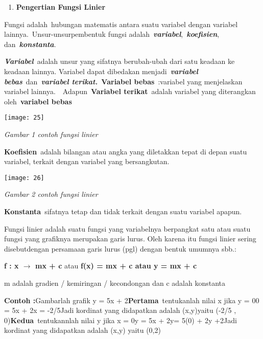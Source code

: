 \documentclass[11pt,fleqn]{book} %
\begin{document}
\begin{enumerate}
\item \textbf{ Pengertian Fungsi Linier}
\end{enumerate}

\noindent \textbf{}

Fungsi adalah~hubungan matematis antara suatu variabel dengan variabel lainnya.~Unsur-unsurpembentuk fungsi adalah~\textbf{\textit{variabel}},~\textbf{\textit{koefisien}}, dan~\textbf{\textit{konstanta}}.

\textbf{\textit{Variabel}}~adalah unsur yang sifatnya berubah-ubah dari satu keadaan ke keadaan lainnya. Variabel dapat dibedakan menjadi~\textbf{\textit{variabel bebas}}~dan~\textbf{\textit{variabel terikat.}}~\textbf{Variabel bebas}~:variabel yang menjelaskan variabel lainnya.~~Adapun~\textbf{Variabel terikat}~adalah variabel yang diterangkan oleh~\textbf{variabel bebas}

\begin{center}
\texttt{[image: 25]}
\end{center}

\textit{Gambar 1 contoh fungsi linier}

\textbf{Koefisien}~adalah bilangan atau angka yang diletakkan tepat di depan suatu variabel, terkait dengan variabel yang bersangkutan.

\begin{center}
\texttt{[image: 26]}
\end{center}

\textit{Gambar 2 contoh fungsi linier}



\textbf{Konstanta}~sifatnya tetap dan tidak terkait dengan suatu variabel apapun.



Fungsi linier adalah suatu fungsi yang variabelnya berpangkat satu atau suatu fungsi yang grafiknya merupakan garis lurus. Oleh karena itu fungsi linier sering disebutdengan persamaan garis lurus (pgl) dengan bentuk umumnya sbb.:

\textbf{f : x $\boldsymbol{\mathrm{\to}}$ mx + c} atau \textbf{f(x) = mx + c atau y = mx + c}

m adalah gradien / kemiringan / kecondongan dan c adalah konstanta



\noindent \textbf{Contoh :}Gambarlah grafik y = 5x + 2\textbf{Pertama}~tentukanlah nilai x jika y = 00 = 5x + 2x = -2/5Jadi kordinat yang didapatkan adalah (x,y)yaitu (-2/5 , 0)\textbf{Kedua}~tentukannlah nilai y jika x = 0y = 5x + 2y= 5(0) + 2y +2Jadi kordinat yang didapatkan adalah (x,y) yaitu (0,2)
\end{document}
